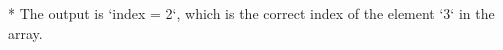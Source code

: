 \documentclass[preview]{standalone}
\begin{document}
* The output is `index = 2`, which is the correct index of the element `3` in the array.\\
\end{document}

